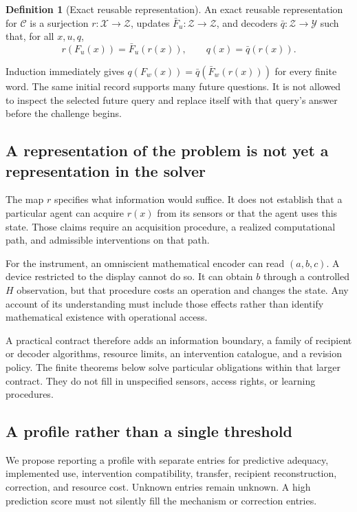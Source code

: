 \documentclass[11pt,letterpaper]{article}
\theoremstyle{plain}
\theoremstyle{definition}
\newtheorem{definition}[theorem]{Definition}
\newcommand{\X}{\mathcal X}\newcommand{\Z}{\mathcal Z}
\newcommand{\Y}{\mathcal Y}\newcommand{\C}{\mathcal C}
\begin{document}
\begin{definition}[Exact reusable representation]\label{def:representation}
An exact reusable representation for $\C$ is a surjection $r:\X\to\Z$, updates $\bar F_u:\Z\to\Z$, and decoders $\bar q:\Z\to\Y$ such that, for all $x,u,q$,
\begin{equation}\label{eq:representation-contract}
r(F_u(x))=\bar F_u(r(x)),\qquad q(x)=\bar q(r(x)).
\end{equation}
\end{definition}
Induction immediately gives $q(F_w(x))=\bar q(\bar F_w(r(x)))$ for every finite word. The same initial record supports many future questions. It is not allowed to inspect the selected future query and replace itself with that query's answer before the challenge begins.

\subsection{A representation of the problem is not yet a representation in the solver}
The map $r$ specifies what information would suffice. It does not establish that a particular agent can acquire $r(x)$ from its sensors or that the agent uses this state. Those claims require an acquisition procedure, a realized computational path, and admissible interventions on that path.

For the instrument, an omniscient mathematical encoder can read $(a,b,c)$. A device restricted to the display cannot do so. It can obtain $b$ through a controlled $H$ observation, but that procedure costs an operation and changes the state. Any account of its understanding must include those effects rather than identify mathematical existence with operational access.

A practical contract therefore adds an information boundary, a family of recipient or decoder algorithms, resource limits, an intervention catalogue, and a revision policy. The finite theorems below solve particular obligations within that larger contract. They do not fill in unspecified sensors, access rights, or learning procedures.

\subsection{A profile rather than a single threshold}
We propose reporting a profile with separate entries for predictive adequacy, implemented use, intervention compatibility, transfer, recipient reconstruction, correction, and resource cost. Unknown entries remain unknown. A high prediction score must not silently fill the mechanism or correction entries.
\end{document}
